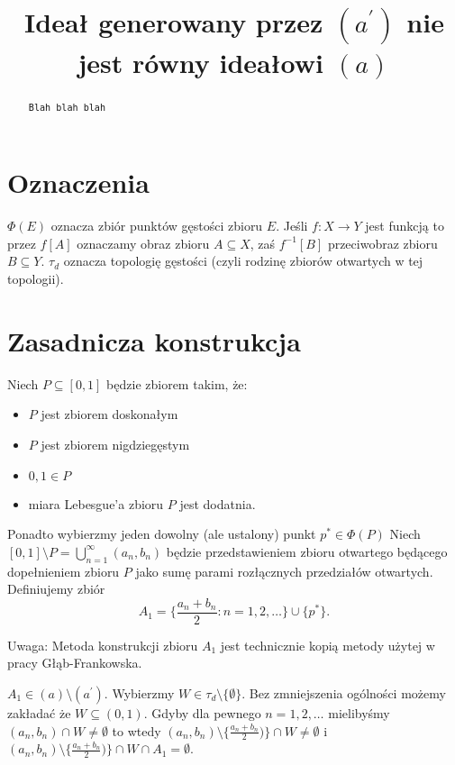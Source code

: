 \documentclass[12pt]{amsart}
\author{\dummy}
\theoremstyle{plain}
\theoremstyle{definition}
\theoremstyle{remark}
\newcommand{\dummy}{{\tt Blah blah blah}}
\newcommand{\aideal}{\mathit{(a)}}
\newcommand{\aidealprime}{\mathit{(a^\prime)}}
\begin{document}
\title{Ideał generowany przez $\aidealprime$ nie jest równy ideałowi $\aideal$}

\begin{abstract}
\dummy
\end{abstract}

\maketitle

\section{Oznaczenia}
$\Phi(E)$ oznacza zbiór punktów gęstości zbioru $E$.
Jeśli $f \colon X \to Y$ jest funkcją to przez
$f[A]$ oznaczamy obraz zbioru $A\subseteq X$, 
zaś $f^{-1}[B]$ przeciwobraz zbioru $B \subseteq Y$.
$\tau_d$ oznacza topologię gęstości (czyli rodzinę zbiorów otwartych w tej topologii).

\section{Zasadnicza konstrukcja}

Niech $P \subseteq [0,1]$ będzie zbiorem takim, że:
\begin{itemize}
\item
  $P$ jest zbiorem doskonałym
\item
  $P$ jest zbiorem nigdziegęstym
\item
  $0, 1 \in P$
\item
  miara Lebesgue'a zbioru $P$ jest dodatnia.
\end{itemize}

Ponadto wybierzmy jeden dowolny (ale ustalony) punkt $p^* \in \Phi(P)$
Niech $[0, 1] \setminus P = \bigcup_{n=1}^\infty (a_n, b_n)$ będzie
przedstawieniem zbioru otwartego będącego dopełnieniem zbioru $P$
jako sumę parami rozłącznych przedziałów otwartych.
Definiujemy zbiór
\[ A_1 = \lbrace \frac{a_n + b_n}{2} \colon n = 1,2,\ldots\rbrace \cup \lbrace p^* \rbrace.
\]


Uwaga: Metoda konstrukcji zbioru $A_1$ jest technicznie kopią metody
użytej w pracy Głąb-Frankowska.

 $A_1 \in \aideal \setminus \aidealprime$.
Wybierzmy $W \in \tau_d \setminus \lbrace \emptyset \rbrace$.
Bez zmniejszenia ogólności możemy zakładać że 
$W \subseteq (0, 1)$. Gdyby dla pewnego 
$n = 1,2,\ldots$ mielibyśmy $(a_n, b_n) \cap W \not= \emptyset$
to wtedy $(a_n, b_n) \setminus \lbrace \frac{a_n + b_n}{2}) \rbrace \cap W \not= \emptyset$
i $(a_n, b_n) \setminus \lbrace \frac{a_n + b_n}{2}) \rbrace \cap W \cap A_1 = \emptyset$.
\end{document}
